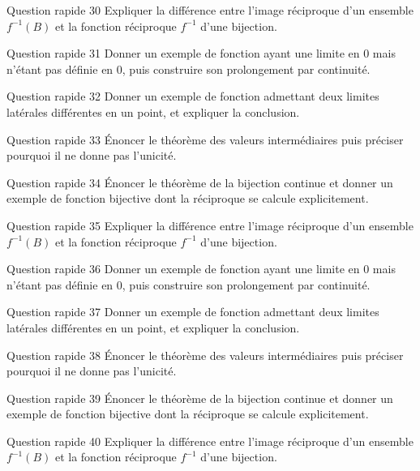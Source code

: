 \documentclass[11pt,a4paper]{article}
\begin{document}
\begin{exobox}{Question rapide 30}
Expliquer la différence entre l'image réciproque d'un ensemble $f^{-1}(B)$ et la fonction réciproque $f^{-1}$ d'une bijection.
\end{exobox}
\begin{exobox}{Question rapide 31}
Donner un exemple de fonction ayant une limite en $0$ mais n'étant pas définie en $0$, puis construire son prolongement par continuité.
\end{exobox}
\begin{exobox}{Question rapide 32}
Donner un exemple de fonction admettant deux limites latérales différentes en un point, et expliquer la conclusion.
\end{exobox}
\begin{exobox}{Question rapide 33}
Énoncer le théorème des valeurs intermédiaires puis préciser pourquoi il ne donne pas l'unicité.
\end{exobox}
\begin{exobox}{Question rapide 34}
Énoncer le théorème de la bijection continue et donner un exemple de fonction bijective dont la réciproque se calcule explicitement.
\end{exobox}
\begin{exobox}{Question rapide 35}
Expliquer la différence entre l'image réciproque d'un ensemble $f^{-1}(B)$ et la fonction réciproque $f^{-1}$ d'une bijection.
\end{exobox}
\begin{exobox}{Question rapide 36}
Donner un exemple de fonction ayant une limite en $0$ mais n'étant pas définie en $0$, puis construire son prolongement par continuité.
\end{exobox}
\begin{exobox}{Question rapide 37}
Donner un exemple de fonction admettant deux limites latérales différentes en un point, et expliquer la conclusion.
\end{exobox}
\begin{exobox}{Question rapide 38}
Énoncer le théorème des valeurs intermédiaires puis préciser pourquoi il ne donne pas l'unicité.
\end{exobox}
\begin{exobox}{Question rapide 39}
Énoncer le théorème de la bijection continue et donner un exemple de fonction bijective dont la réciproque se calcule explicitement.
\end{exobox}
\begin{exobox}{Question rapide 40}
Expliquer la différence entre l'image réciproque d'un ensemble $f^{-1}(B)$ et la fonction réciproque $f^{-1}$ d'une bijection.
\end{exobox}
\end{document}
